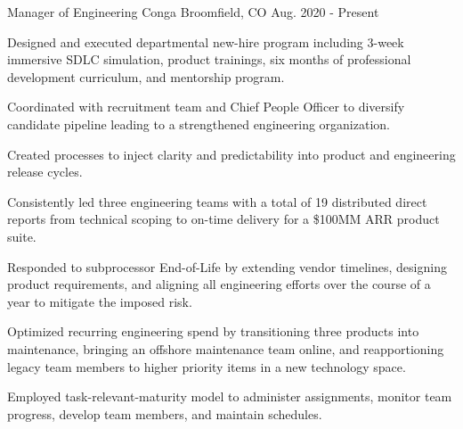 

\begin{cventries}

  \cventry
    {Manager of Engineering} %
    {Conga} %
    {Broomfield, CO} %
    {Aug. 2020 - Present} %
    {
      \begin{cvitems} %
	\item {Designed and executed departmental new-hire program including 3-week immersive SDLC simulation, product trainings, six months of professional development curriculum, and mentorship program.}
	\item {Coordinated with recruitment team and Chief People Officer to diversify candidate pipeline leading to a strengthened engineering organization.}
	\item {Created processes to inject clarity and predictability into product and engineering release cycles.}
	\item {Consistently led three engineering teams with a total of 19 distributed direct reports from technical scoping to on-time delivery for a \$100MM ARR product suite.}
	\item {Responded to subprocessor End-of-Life by extending vendor timelines, designing product requirements, and aligning all engineering efforts over the course of a year to mitigate the imposed risk.}
	\item {Optimized recurring engineering spend by transitioning three products into maintenance, bringing an offshore maintenance team online, and reapportioning legacy team members to higher priority items in a new technology space.}
	\item {Employed task-relevant-maturity model to administer assignments, monitor team progress, develop team members, and maintain schedules.}
      \end{cvitems}
    }


\end{cventries}
